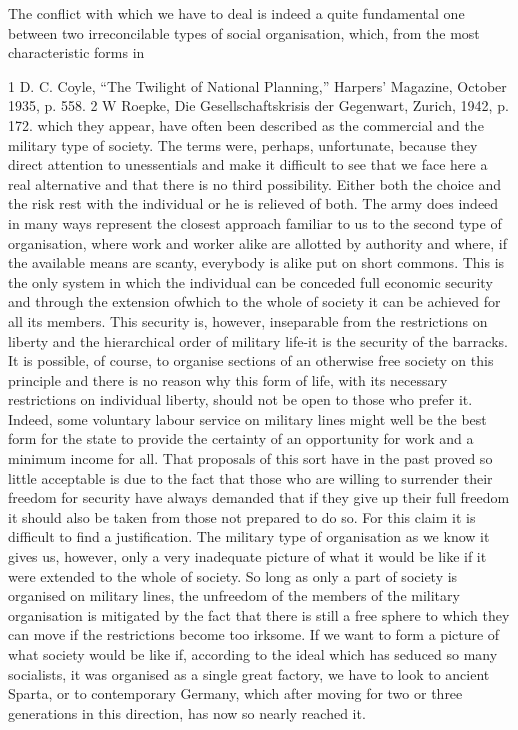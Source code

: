 \documentclass[11pt,openany]{book}
\begin{document}
The conflict with which we have to deal is indeed a quite fundamental one between two irreconcilable types of social organisation, which, from the most characteristic forms in

1 D. C. Coyle, ``The Twilight of National Planning,'' Harpers' Magazine, October 1935, p. 558. 2 W Roepke, Die Gesellschaftskrisis der Gegenwart, Zurich, 1942, p. 172. which they appear, have often been described as the commercial and the military type of society. The terms were, perhaps, unfortunate, because they direct attention to unessentials and make it difficult to see that we face here a real alternative and that there is no third possibility. Either both the choice and the risk rest with the individual or he is relieved of both. The army does indeed in many ways represent the closest approach familiar to us to the second type of organisation, where work and worker alike are allotted by authority and where, if the available means are scanty, everybody is alike put on short commons. This is the only system in which the individual can be conceded full economic security and through the extension ofwhich to the whole of society it can be achieved for all its members. This security is, however, inseparable from the restrictions on liberty and the hierarchical order of military life-it is the security of the barracks. It is possible, of course, to organise sections of an otherwise free society on this principle and there is no reason why this form of life, with its necessary restrictions on individual liberty, should not be open to those who prefer it. Indeed, some voluntary labour service on military lines might well be the best form for the state to provide the certainty of an opportunity for work and a minimum income for all. That proposals of this sort have in the past proved so little acceptable is due to the fact that those who are willing to surrender their freedom for security have always demanded that if they give up their full freedom it should also be taken from those not prepared to do so. For this claim it is difficult to find a justification. The military type of organisation as we know it gives us, however, only a very inadequate picture of what it would be like if it were extended to the whole of society. So long as only a part of society is organised on military lines, the unfreedom of the members of the military organisation is mitigated by the fact that there is still a free sphere to which they can move if the restrictions become too irksome. If we want to form a picture of what society would be like if, according to the ideal which has seduced so many socialists, it was organised as a single great factory, we have to look to ancient Sparta, or to contemporary Germany, which after moving for two or three generations in this direction, has now so nearly reached it.
\end{document}

